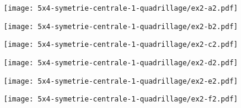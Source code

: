 \begin{multicols}{2}
  
  \begin{figure}[H]
    \centering
    \texttt{[image: 5x4-symetrie-centrale-1-quadrillage/ex2-a2.pdf]}
  \end{figure}
  
  \begin{figure}[H]
    \centering
    \texttt{[image: 5x4-symetrie-centrale-1-quadrillage/ex2-b2.pdf]}
  \end{figure}
  
  \begin{figure}[H]
    \centering
    \texttt{[image: 5x4-symetrie-centrale-1-quadrillage/ex2-c2.pdf]}
  \end{figure}
  
  \begin{figure}[H]
    \centering
    \texttt{[image: 5x4-symetrie-centrale-1-quadrillage/ex2-d2.pdf]}
  \end{figure}
  
  \end{multicols}

  \begin{figure}[H]
    \centering
    \texttt{[image: 5x4-symetrie-centrale-1-quadrillage/ex2-e2.pdf]}
  \end{figure}

  \begin{figure}[H]
    \centering
    \texttt{[image: 5x4-symetrie-centrale-1-quadrillage/ex2-f2.pdf]}
  \end{figure}
  



